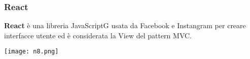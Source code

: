 \begin{frame}
\frametitle{React}
	\par
  	\textbf{React} è una libreria JavaScriptG usata da Facebook e 			Instangram per creare interfacce
	utente ed è considerata la View del pattern MVC.\\
	\begin{flushleft}
		\texttt{[image: n8.png]}
	\end{flushleft}
\end{frame}


